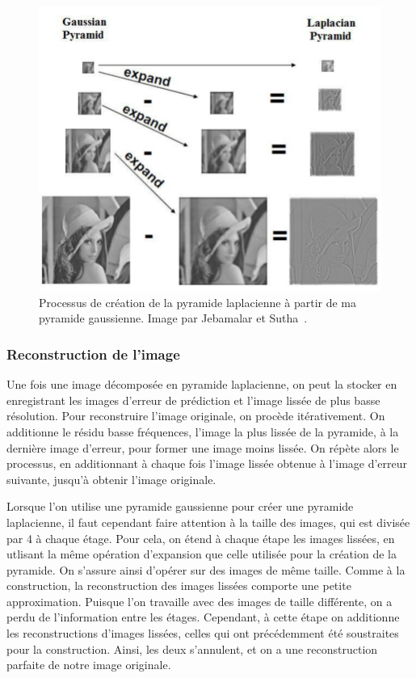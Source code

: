 \begin{figure}
    \centering
    \includegraphics[width=.75\textwidth]{contenu/resources/images/gauss_laplace_pyramid}
    \caption[Relation entre pyramide gaussienne et laplacienne]{Processus de création de la pyramide laplacienne à partir de ma pyramide gaussienne. Image par Jebamalar et Sutha~\cite{jebamalar_design_2014}.}
    \label{fig:gauss-laplace-pyramid}
\end{figure}

\subsubsection{Reconstruction de l'image}

Une fois une image décomposée en pyramide laplacienne, on peut la stocker en enregistrant les images d'erreur de prédiction et l'image lissée de plus basse résolution. Pour reconstruire l'image originale, on procède itérativement. On additionne le résidu basse fréquences, l'image la plus lissée de la pyramide, à la dernière image d'erreur, pour former une image moins lissée. On répète alors le processus, en additionnant à chaque fois l'image lissée obtenue à l'image d'erreur suivante, jusqu'à obtenir l'image originale.

\bigskip

Lorsque l'on utilise une pyramide gaussienne pour créer une pyramide laplacienne, il faut cependant faire attention à la taille des images, qui est divisée par 4 à chaque étage. Pour cela, on étend à chaque étape les images lissées, en utlisant la même opération d'expansion que celle utilisée pour la création de la pyramide. On s'assure ainsi d'opérer sur des images de même taille. Comme à la construction, la reconstruction des images lissées comporte une petite approximation. Puisque l'on travaille avec des images de taille différente, on a perdu de l'information entre les étages. Cependant, à cette étape on additionne les reconstructions d'images lissées, celles qui ont précédemment été soustraites pour la construction. Ainsi, les deux s'annulent, et on a une reconstruction parfaite de notre image originale.

